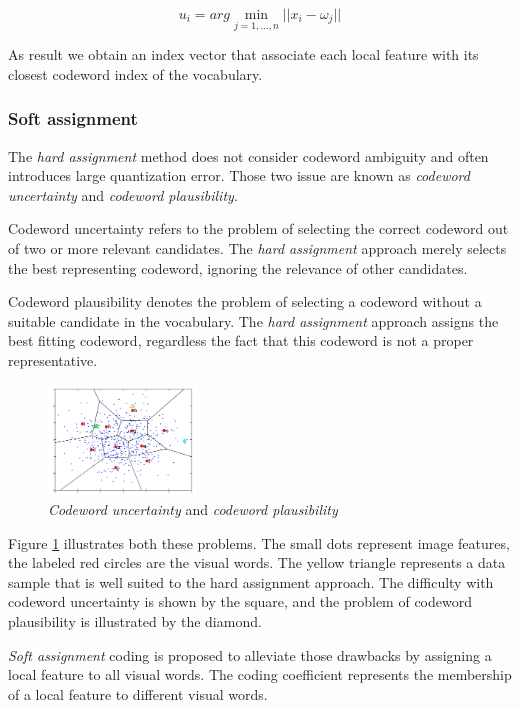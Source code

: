 $$u_i = arg \min_{j = 1, \ldots, n} ||x_i - \omega_j||$$

As result we obtain an index vector that associate each local feature with its closest codeword index of the vocabulary.

\subsubsection{Soft assignment}

The \emph{hard assignment} method does not consider codeword ambiguity and often introduces large quantization error. Those two issue are known as \emph{codeword uncertainty} and \emph{codeword plausibility}. 

Codeword uncertainty refers to the problem of selecting the correct codeword out of two or more relevant candidates. The \emph{hard assignment} approach merely selects the best representing codeword, ignoring the relevance of other candidates. 

Codeword plausibility denotes the problem of selecting a codeword without a suitable candidate in the vocabulary. The \emph{hard assignment} approach assigns the best fitting codeword, regardless the fact that this codeword is not a proper representative. 

\begin{figure}[h]
\begin{center}
\includegraphics[width=0.35\textwidth]{images/soft-assignment.jpg}
\end{center}
  \caption{\emph{Codeword uncertainty} and \emph{codeword plausibility}}
\label{fig:softAssignment}
\end{figure}

Figure \ref{fig:softAssignment} illustrates both these problems. The small dots represent image features, the labeled red circles are the visual words. The yellow triangle represents a data sample that is well suited to the hard assignment approach. The difficulty with codeword uncertainty is shown by the square, and the problem of codeword plausibility is illustrated by the diamond.

\emph{Soft assignment} coding is proposed to alleviate those drawbacks by assigning a local feature to all visual words. The coding coefficient represents the membership of a local feature to different visual words.

